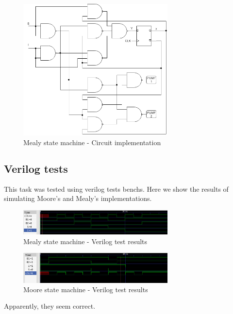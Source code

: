 \begin{figure}[H]
    \begin{centering}
    \includegraphics[width=0.7\textwidth]{data/Graficos1/1b_Compuertas_Mealy.png}
    \par\end{centering}
    \caption{Mealy state machine - Circuit implementation}
\end{figure}

\newpage
\subsection *{Verilog tests}
This task was tested using verilog tests benchs. Here we show the results of simulating Moore's and Mealy's implementations.

\begin{figure}[H]
    \begin{centering}
    \includegraphics[width=0.7\textwidth]{data/Graficos1/ej1a.png}
    \par\end{centering}
    \caption{Mealy state machine - Verilog test results}
\end{figure}

\begin{figure}[H]
    \begin{centering}
    \includegraphics[width=0.7\textwidth]{data/Graficos1/ej1b.png}
    \par\end{centering}
    \caption{Moore state machine - Verilog test results}
\end{figure}

Apparently, they seem correct.